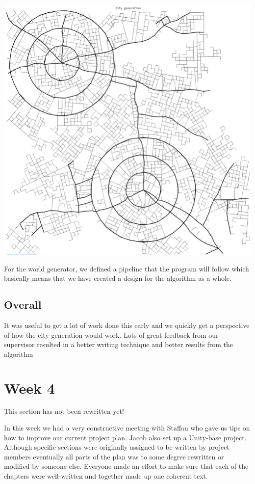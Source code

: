 \documentclass[11pt]{article}
\begin{document}
\begin{w-1/2}
\begin{center}
\includegraphics[width=.9\linewidth]{./images/week1/img-000.png}
\end{center}
\end{w-1/2}

For the world generator, we defined a pipeline that the program will follow
which basically means that we have created a design for the algorithm as a
whole.

\subsection*{Overall}
\label{sec:org6ba8d52}
It was useful to get a lot of work done this early and we quickly get a
perspective of how the city generation would work. Lots of great feedback from
our supervisor resulted in a better writing technique and better results from
the algorithm

\section*{Week 4}
\label{sec:org1c77a8a}
\begin{notice-warning}
This section has not been rewritten yet!
\end{notice-warning}

In this week we had a very constructive meeting with Staffan who gave us tips on
how to improve our current project plan. Jacob also set up a Unity-base project.
Although specific sections were originally assigned to be written by project
members eventually all parts of the plan was to some degree rewritten or
modified by someone else. Everyone made an effort to make sure that each of the
chapters were well-written and together made up one coherent text.
\end{document}
